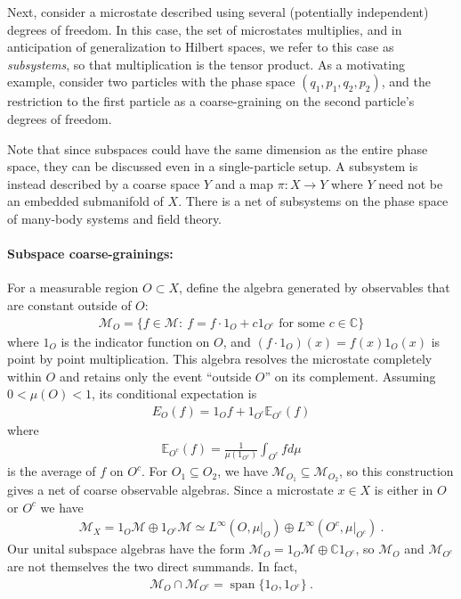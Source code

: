 \documentclass[a4paper,11pt]{article}
\theoremstyle{definition}
\begin{document}
Next, consider a microstate described using several (potentially independent) degrees of freedom. In this case, the set of microstates multiplies, and in anticipation of generalization to Hilbert spaces, we refer to this case as {\it subsystems}, so that multiplication is the tensor product. As a motivating example, consider two particles with the phase space $(q_1,p_1,q_2,p_2)$, and the restriction to the first particle as a coarse-graining on the second particle's degrees of freedom. 

Note that since subspaces could have the same dimension as the entire phase space, they can be discussed even in a single-particle setup. A subsystem is instead described by a coarse space $Y$ and a map $\pi: X\to Y$ where $Y$ need not be an embedded submanifold of $X$. There is a net of subsystems on the phase space of many-body systems and field theory.



\paragraph{Subspace coarse-grainings:}
For a measurable region $O\subset X$, define the algebra generated by observables that are constant outside of $O$:
\begin{align}
    \mathcal M_O=\{f\in\mathcal M:\ f=f \cdot 1_O +c 1_{O^c}\text{ for some }c\in\mathbb C\}
\end{align}
where $1_O$ is the indicator function on $O$, and $(f\cdot 1_O)(x)=f(x)1_O(x)$ is point by point multiplication.
This algebra resolves the microstate completely within $O$ and retains only the event ``outside $O$'' on its complement. Assuming $0<\mu(O)<1$, its conditional expectation is
\begin{align}
    E_O(f)=1_O f+
    1_{O^c}\mathbb{E}_{O^c}(f)
\end{align}
where 
\begin{align}
    \mathbb{E}_{O^c}(f)=\frac{1}{\mu(1_{O^c})}\int_{O^c} f d\mu
\end{align}
is the average of $f$ on $O^c$.
For $O_1\subseteq O_2$, we have $\mathcal M_{O_1}\subseteq\mathcal M_{O_2}$, so this construction gives a net of coarse observable algebras. Since a microstate $x\in X$ is either in $O$ or $O^c$ we have 
\begin{align}
    \mathcal M_X=1_O\mathcal M\oplus 1_{O^c}\mathcal M
    \simeq L^\infty(O,\mu|_O)\oplus L^\infty(O^c,\mu|_{O^c})\ .
\end{align}
Our unital subspace algebras have the form $\mathcal M_O=1_O\mathcal M\oplus\mathbb C1_{O^c}$, so $\mathcal M_O$ and $\mathcal M_{O^c}$ are not themselves the two direct summands. In fact,
\begin{align}
    \mathcal M_O\cap\mathcal M_{O^c}=\operatorname{span}\{1_O,1_{O^c}\}\ .
\end{align}
\end{document}

